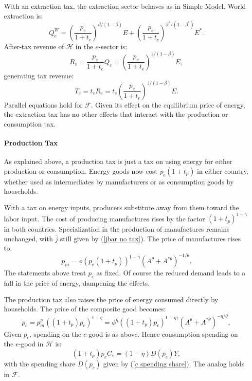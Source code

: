 \documentclass[notitlepage,12pt]{article}
\begin{document}
With an extraction tax, the extraction sector behaves as in Simple Model.
World extraction is:%
\begin{equation*}
Q_{e}^{W}=\left( \frac{p_{e}}{1+t_{e}}\right) ^{\beta /(1-\beta )}E+\left( 
\frac{p_{e}}{1+t_{e}}\right) ^{\beta ^{\ast }/(1-\beta ^{\ast })}E^{\ast }.
\end{equation*}%
After-tax revenue of $\mathcal{H}$ in the $e$-sector is:%
\begin{equation*}
R_{e}=\frac{p_{e}}{1+t_{e}}Q_{e}=\left( \frac{p_{e}}{1+t_{e}}\right)
^{1/(1-\beta )}E,
\end{equation*}%
generating tax revenue:%
\begin{equation*}
T_{e}=t_{e}R_{e}=t_{e}\left( \frac{p_{e}}{1+t_{e}}\right) ^{1/(1-\beta )}E.
\end{equation*}%
Parallel equations hold for $\mathcal{F}$. Given its effect on the
equilibrium price of energy, the extraction tax has no other effects that
interact with the production or consumption tax.

\paragraph{Production Tax}

As explained above, a production tax is just a tax on using energy for
either production or consumption. Energy goods now cost $p_{e}(1+t_{p})$ in
either country, whether used as intermediates by manufacturers or as
consumption goods by households.

With a tax on energy inputs, producers substitute away from them toward the
labor input. The cost of producing manufactures rises by the factor $%
(1+t_{p})^{1-\gamma }$ in both countries. Specialization in the production
of manufactures remains unchanged, with $\bar{j}$ still given by (\ref{jbar
no tax}). The price of manufactures rises to: 
\begin{equation*}
p_{m}=\phi (p_{e}\left( 1+t_{p}\right) )^{1-\gamma }\left( A^{\theta
}+A^{\ast \theta }\right) ^{-1/\theta }.
\end{equation*}%
The statements above treat $p_{e}$ as fixed. Of course the reduced demand
leads to a fall in the price of energy, dampening the effects.

The production tax also raises the price of energy consumed directly by
households. The price of the composite good becomes:%
\begin{equation}
p_{c}=p_{m}^{\eta }(\left( 1+t_{p}\right) p_{e})^{1-\eta }=\phi ^{\eta
}(\left( 1+t_{p}\right) p_{e})^{1-\eta \gamma }\left( A^{\theta }+A^{\ast
\theta }\right) ^{-\eta /\theta },  \label{pc uniform production tax}
\end{equation}%
Given $p_{c}$, spending on the $c$-good is as above. Hence consumption
spending on the $e$-good in $\mathcal{H}$ is:%
\begin{equation*}
(1+t_{p})p_{e}C_{e}=\left( 1-\eta \right) D(p_{c})Y,
\end{equation*}%
with the spending share $D(p_{c})$ given by (\ref{c spending share}). The
analog holds in $\mathcal{F}$.
\end{document}
